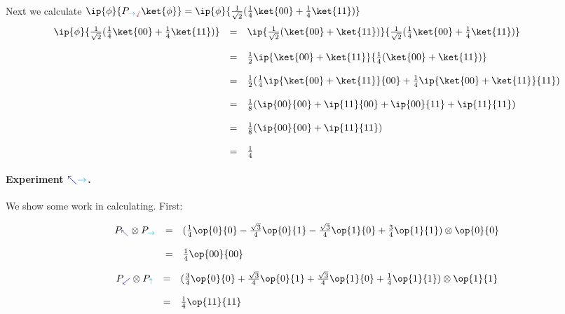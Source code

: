 \documentclass{article}
\newcommand{\xplus}{{\color{cyan}\rightarrow}}
\newcommand{\xminus}{{\color{cyan}\uparrow}}
\newcommand{\yplus}{{\color{blue}\nwarrow}}
\newcommand{\yminus}{{\color{blue}\swarrow}}
\newcommand{\zplus}{{\color{red}\sswarrow}}
\theoremstyle{remark}
\def\srtt{\frac{1}{\sqrt{2}}}
\begin{document}
Next we calculate 
$\ip{\phi}{P_{\xplus\zplus}\ket{\phi}} = \ip{\phi}{ \srtt(\frac{1}{4}\ket{00} + \frac{1}{4}\ket{11})}$
\[
    \begin{array}{rcl}
        \ip{\phi}{\srtt(\frac{1}{4}\ket{00} + \frac{1}{4}\ket{11})} 
        &=& 
        \ip{\srtt(\ket{00} + \ket{11})}{\srtt(\frac{1}{4}\ket{00} + \frac{1}{4}\ket{11})} 
        \\ \\
        &=& \frac{1}{2}\ip{\ket{00} + \ket{11}}{\frac{1}{4}(\ket{00} + \ket{11})}
        \\ \\
        &=& \frac{1}{2}(\frac{1}{4}\ip{\ket{00} + \ket{11}}{00} 
        + \frac{1}{4}\ip{\ket{00} + \ket{11}}{11})
        \\ \\
        &=& \frac{1}{8}(\ip{00}{00} + \ip{11}{00} + \ip{00}{11} + \ip{11}{11} )
        \\ \\
        &=& \frac{1}{8}(\ip{00}{00} + \ip{11}{11})
        \\ \\
        &=& \frac{1}{4}
    \end{array}
\]


\paragraph*{Experiment $\yplus\xplus$.} 
We show some work in calculating. First:

\[
    \begin{array}{rcl}
    P_{\yplus}\otimes P_{\xplus}
        &=& 
        (\frac{1}{4} \op{0}{0} 
        - \frac{\sqrt{3}}{4} \op{0}{1} 
        - \frac{\sqrt{3}}{4} \op{1}{0} 
        + \frac{3}{4} \op{1}{1})
      \otimes 
        \op{0}{0}  
        \\ \\
        &=&  \frac{1}{4} \op{00}{00} 
    \end{array}
\]

\[
    \begin{array}{rcl}
    P_{\yminus}\otimes P_{\xminus}
        &=& (\frac{3}{4} \op{0}{0} 
            + \frac{\sqrt{3}}{4} \op{0}{1} 
            + \frac{\sqrt{3}}{4} \op{1}{0} 
            + \frac{1}{4} \op{1}{1})
        \otimes \op{1}{1}
            \\ \\
        &=&  \frac{1}{4} \op{11}{11} 
    \end{array}
\]
\end{document}
